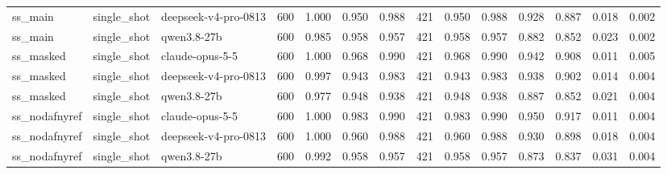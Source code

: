 \begin{tabular}{lllrrrrrrrrrrr}
ss\_main & single\_shot & deepseek-v4-pro-0813 & 600 & 1.000 & 0.950 & 0.988 & 421 & 0.950 & 0.988 & 0.928 & 0.887 & 0.018 & 0.002 \\
ss\_main & single\_shot & qwen3.8-27b & 600 & 0.985 & 0.958 & 0.957 & 421 & 0.958 & 0.957 & 0.882 & 0.852 & 0.023 & 0.002 \\
ss\_masked & single\_shot & claude-opus-5-5 & 600 & 1.000 & 0.968 & 0.990 & 421 & 0.968 & 0.990 & 0.942 & 0.908 & 0.011 & 0.005 \\
ss\_masked & single\_shot & deepseek-v4-pro-0813 & 600 & 0.997 & 0.943 & 0.983 & 421 & 0.943 & 0.983 & 0.938 & 0.902 & 0.014 & 0.004 \\
ss\_masked & single\_shot & qwen3.8-27b & 600 & 0.977 & 0.948 & 0.938 & 421 & 0.948 & 0.938 & 0.887 & 0.852 & 0.021 & 0.004 \\
ss\_nodafnyref & single\_shot & claude-opus-5-5 & 600 & 1.000 & 0.983 & 0.990 & 421 & 0.983 & 0.990 & 0.950 & 0.917 & 0.011 & 0.004 \\
ss\_nodafnyref & single\_shot & deepseek-v4-pro-0813 & 600 & 1.000 & 0.960 & 0.988 & 421 & 0.960 & 0.988 & 0.930 & 0.898 & 0.018 & 0.004 \\
ss\_nodafnyref & single\_shot & qwen3.8-27b & 600 & 0.992 & 0.958 & 0.957 & 421 & 0.958 & 0.957 & 0.873 & 0.837 & 0.031 & 0.004 \\
\bottomrule
\end{tabular}

